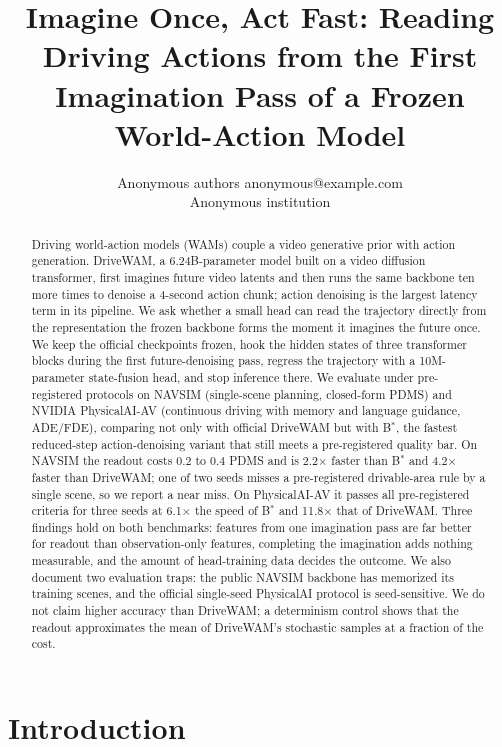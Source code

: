 \documentclass[10pt]{article}
\title{Imagine Once, Act Fast: Reading Driving Actions from the First Imagination Pass of a Frozen World-Action Model}
\author{\name Anonymous authors \email anonymous@example.com \\
      \addr Anonymous institution}
\newcommand{\Bstar}{B$^{*}$}
\begin{document}
\maketitle

\begin{abstract}
Driving world-action models (WAMs) couple a video generative prior with action generation. DriveWAM, a 6.24B-parameter model built on a video diffusion transformer, first imagines future video latents and then runs the same backbone ten more times to denoise a 4-second action chunk; action denoising is the largest latency term in its pipeline. We ask whether a small head can read the trajectory directly from the representation the frozen backbone forms the moment it imagines the future once. We keep the official checkpoints frozen, hook the hidden states of three transformer blocks during the first future-denoising pass, regress the trajectory with a 10M-parameter state-fusion head, and stop inference there. We evaluate under pre-registered protocols on NAVSIM (single-scene planning, closed-form PDMS) and NVIDIA PhysicalAI-AV (continuous driving with memory and language guidance, ADE/FDE), comparing not only with official DriveWAM but with \Bstar{}, the fastest reduced-step action-denoising variant that still meets a pre-registered quality bar. On NAVSIM the readout costs 0.2 to 0.4 PDMS and is 2.2$\times$ faster than \Bstar{} and 4.2$\times$ faster than DriveWAM; one of two seeds misses a pre-registered drivable-area rule by a single scene, so we report a near miss. On PhysicalAI-AV it passes all pre-registered criteria for three seeds at 6.1$\times$ the speed of \Bstar{} and 11.8$\times$ that of DriveWAM. Three findings hold on both benchmarks: features from one imagination pass are far better for readout than observation-only features, completing the imagination adds nothing measurable, and the amount of head-training data decides the outcome. We also document two evaluation traps: the public NAVSIM backbone has memorized its training scenes, and the official single-seed PhysicalAI protocol is seed-sensitive. We do not claim higher accuracy than DriveWAM; a determinism control shows that the readout approximates the mean of DriveWAM's stochastic samples at a fraction of the cost.
\end{abstract}

\section{Introduction}
\label{sec:intro}
\end{document}

